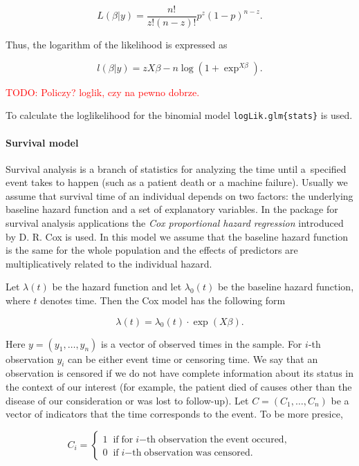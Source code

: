 \documentclass[12pt]{article}
\newcommand{\todo}{\textcolor{red}}
\newcommand{\code}{\texttt}
\begin{document}
$$L\left(\beta | y \right) = 
\frac{n!}{z!\left(n - z\right)!}p ^z \left(1 - p\right)^{n - z}.$$

Thus, the logarithm of the likelihood is expressed as 

$$l\left(\beta|y\right) = zX\beta - n \log{\left(1 + \exp^{X\beta}\right)}.$$

\todo{TODO: Policzy? loglik, czy na pewno dobrze.}

To calculate the loglikelihood for the binomial model \code{logLik.glm\{stats\}} is used.

\paragraph{Survival model}

Survival analysis is a branch of statistics for analyzing the time until a~specified event takes to happen (such as a patient death or a machine failure). Usually we assume that survival time of an individual depends on two factors: the underlying baseline hazard function and a set of explanatory variables. In the package for survival analysis applications the \emph{Cox proportional hazard regression} introduced by D. R. Cox \citep{coxph} is used. In this model we assume that the baseline hazard function is the same for the whole population and the effects of predictors are multiplicatively related to the individual hazard. 

Let $\lambda(t)$ be the hazard function and let $\lambda_0(t)$ be the baseline hazard function, where $t$ denotes time. Then the Cox model has the following form

$$\lambda(t) = 
\lambda_0(t)\cdot \exp{(X\beta)}.$$

Here $y = (y_1, \ldots, y_n)$ is a vector of observed times in the sample. For $i$-th observation $y_i$ can be either event time or censoring time. We say that an observation is censored if we do not have complete information about its status in the context of our interest (for example, the patient died  of causes other than the disease of our consideration or was lost to follow-up). Let $C = (C_1, \ldots, C_n)$ be a vector of indicators that the time corresponds to the event. To be more presice,

$$C_i = \left\{
                \begin{array}{ll}
                  1 \;\; \mathrm{if \; for} \; i 
                  \mathrm{-th \; 
                  observation \; the \; event \; occured,} \\
                  0 \;\; \mathrm{if} \; i \mathrm{-th \;
                  observation \; was \; censored.}
                \end{array}
              \right.$$
\end{document}
